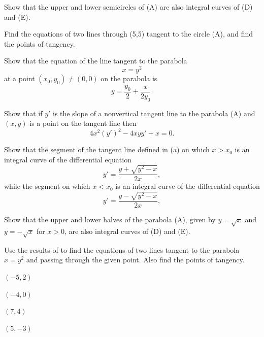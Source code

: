\begin{exerciselist}
\begin{alist}

\item %
Show that the upper and lower semicircles of (A) are also integral
curves of (D) and (E).

\item %
Find the equations of two lines through (5,5) tangent to the circle
(A), and find the points of tangency.
\end{alist}

\item\label{exer:4.5.16}\begin{alist}
\item %
Show that the equation of the line tangent to the  parabola
\[
x=y^2\tag{A}
\]
at a point $(x_0,y_0)\ne(0,0)$  on the parabola is
\[
y=\dfrac{y_0}{2}+\dfrac{x}{2y_0}.\tag{B}
\]
\item %
Show that if $y'$ is the slope of a nonvertical tangent line
to the parabola (A) and $(x,y)$ is a point on the tangent
line then
\[
4x^2(y')^2-4xyy'+x=0.\tag{C}
\]
\item %
Show that the segment of the tangent line defined in (a) on which
$x>x_0$ is an integral curve of the differential equation
\[
y'=\frac{y+\sqrt{y^2-x}}{2x},\tag{D}
\]
while the segment on which $x<x_0$ is an integral curve of the
differential equation
\[
y'=\frac{y-\sqrt{y^2-x}}{2x},\tag{E}
\]


\item %
Show that the upper and lower halves of the parabola (A), given by
$y=\sqrt x$ and $y=-\sqrt x$ for $x>0$, are also integral curves of
(D) and (E).
\end{alist}

\item\label{exer:4.5.17}Use the results of  to find the equations of two
lines tangent to the parabola $x=y^2$ and passing through the given
point. Also find the points of tangency.

\begin{alist}[columns=4]
\item $(-5,2)$
\item $(-4,0)$
\item $(7,4)$
\item $(5,-3)$
\end{alist}


\end{exerciselist}
